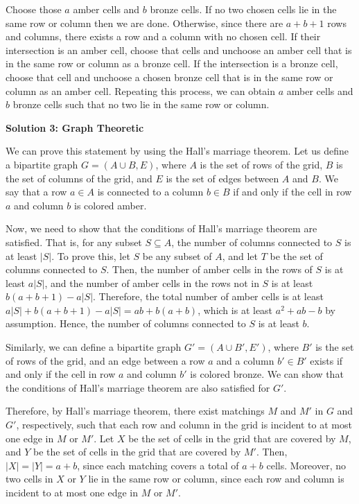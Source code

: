 \begin{enumerate}
 Choose those $a$ amber cells and $b$ bronze cells. If no two chosen cells lie in the same row or column then we are done. Otherwise, since there are $a+b+1$ rows and columns, there exists a row and a column with no chosen cell. If their intersection is an amber cell, choose that cells and unchoose an amber cell that is in the same row or column as a bronze cell. If the intersection is a bronze cell, choose that cell and unchoose a chosen bronze cell that is in the same row or column as an amber cell. Repeating this process, we can obtain $a$ amber cells and $b$ bronze cells such that no two lie in the same row or column.

 



\textbf{Solution 3: Graph Theoretic}

We can prove this statement by using the Hall's marriage theorem. Let us define a bipartite graph $G = (A \cup B, E)$, where $A$ is the set of rows of the grid, $B$ is the set of columns of the grid, and $E$ is the set of edges between $A$ and $B$. We say that a row $a \in A$ is connected to a column $b \in B$ if and only if the cell in row $a$ and column $b$ is colored amber.

 Now, we need to show that the conditions of Hall's marriage theorem are satisfied. That is, for any subset $S \subseteq A$, the number of columns connected to $S$ is at least $|S|$. To prove this, let $S$ be any subset of $A$, and let $T$ be the set of columns connected to $S$. Then, the number of amber cells in the rows of $S$ is at least $a|S|$, and the number of amber cells in the rows not in $S$ is at least $b(a+b+1)-a|S|$. Therefore, the total number of amber cells is at least $a|S| + b(a+b+1)-a|S| = ab + b(a+b)$, which is at least $a^2+ab-b$ by assumption. Hence, the number of columns connected to $S$ is at least $b$.

 Similarly, we can define a bipartite graph $G' = (A \cup B', E')$, where $B'$ is the set of rows of the grid, and an edge between a row $a$ and a column $b' \in B'$ exists if and only if the cell in row $a$ and column $b'$ is colored bronze. We can show that the conditions of Hall's marriage theorem are also satisfied for $G'$.

 Therefore, by Hall's marriage theorem, there exist matchings $M$ and $M'$ in $G$ and $G'$, respectively, such that each row and column in the grid is incident to at most one edge in $M$ or $M'$. Let $X$ be the set of cells in the grid that are covered by $M$, and $Y$ be the set of cells in the grid that are covered by $M'$. Then, $|X| = |Y| = a+b$, since each matching covers a total of $a+b$ cells. Moreover, no two cells in $X$ or $Y$ lie in the same row or column, since each row and column is incident to at most one edge in $M$ or $M'$.


\end{enumerate}
